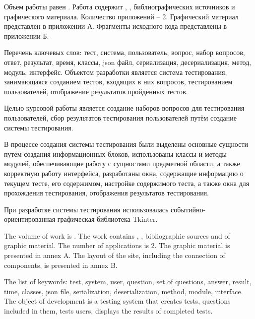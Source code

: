 
Объем работы равен . Работа содержит , ,  библиографических источников и  графического материала. Количество приложений – 2. Графический материал представлен в приложении А. Фрагменты исходного кода представлены в приложении Б.

Перечень ключевых слов: тест, система, пользователь, вопрос, набор вопросов, ответ, результат, время, классы, json файл, сериализация, десериализация, метод, модуль, интерфейс.
Объектом разработки является система тестирования, занимающаяся созданием тестов, входящих в них вопросов, тестированием пользователей, отображение результатов пройденных тестов.

Целью курсовой работы является создание наборов вопросов для тестирования пользователей, сбор результатов тестирования пользователей путём создание системы тестирования.

В процессе создания системы тестирования были выделены основные сущности путем создания информационных блоков, использованы классы и методы модулей, обеспечивающие работу с сущностями предметной области, а также корректную работу интерфейса, разработаны окна, содержащие информацию о текущем тесте, его содержимом, настройке содержимого теста, а также окна для прохождения тестирования, отображения результатов тестирования.

При разработке системы тестирования использовалась событийно-ориентированная графическая библиотека Tkinter.

  
The volume of work is . The work contains , ,  bibliographic sources and  of graphic material. The number of applications is 2. The graphic material is presented in annex A. The layout of the site, including the connection of components, is presented in annex B.

The list of keywords: test, system, user, question, set of questions, answer, result, time, classes, json file, serialization, deserialization, method, module, interface.
The object of development is a testing system that creates tests, questions included in them, tests users, displays the results of completed tests.

